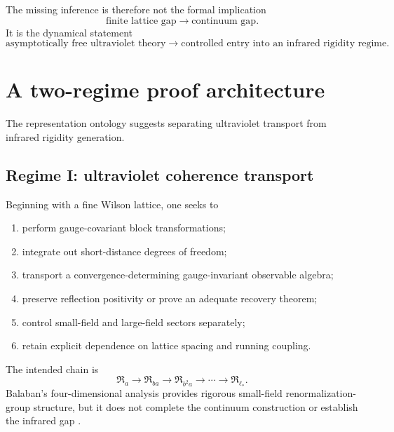 \documentclass[11pt]{article}
\theoremstyle{remark}
\begin{document}
The missing inference is therefore not the formal implication
\begin{equation}
  \text{finite lattice gap}
  \longrightarrow
  \text{continuum gap}.
\end{equation}
It is the dynamical statement
\begin{equation}
\boxed{
  \text{asymptotically free ultraviolet theory}
  \longrightarrow
  \text{controlled entry into an infrared rigidity regime}.}
  \label{eq:missing-inference}
\end{equation}

\section{A two-regime proof architecture}

The representation ontology suggests separating ultraviolet transport from
infrared rigidity generation.

\subsection{Regime I: ultraviolet coherence transport}

Beginning with a fine Wilson lattice, one seeks to
\begin{enumerate}[leftmargin=2em]
  \item perform gauge-covariant block transformations;
  \item integrate out short-distance degrees of freedom;
  \item transport a convergence-determining gauge-invariant observable algebra;
  \item preserve reflection positivity or prove an adequate recovery theorem;
  \item control small-field and large-field sectors separately;
  \item retain explicit dependence on lattice spacing and running coupling.
\end{enumerate}

The intended chain is
\begin{equation}
  \mathfrak R_a
  \longrightarrow
  \mathfrak R_{ba}
  \longrightarrow
  \mathfrak R_{b^2a}
  \longrightarrow\cdots\longrightarrow
  \mathfrak R_{\ell_*}.
  \label{eq:rg-chain}
\end{equation}
Balaban's four-dimensional analysis provides rigorous small-field
renormalization-group structure, but it does not complete the continuum
construction or establish the infrared gap \cite{balaban}.
\end{document}
